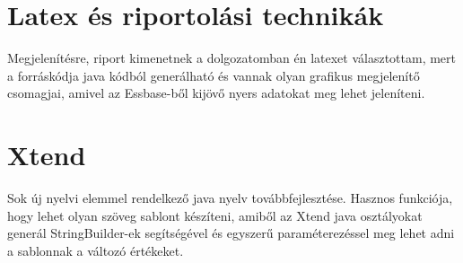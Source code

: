 \section{Latex és riportolási technikák}
Megjelenítésre, riport kimenetnek a dolgozatomban én latexet választottam, mert
a forráskódja java kódból generálható és vannak olyan grafikus megjelenítő
csomagjai, amivel az Essbase-ből kijövő nyers adatokat meg lehet jeleníteni.

\section{Xtend}
Sok új nyelvi elemmel rendelkező java nyelv továbbfejlesztése. Hasznos
funkciója, hogy lehet olyan szöveg sablont készíteni, amiből az Xtend java
osztályokat generál StringBuilder-ek segítségével és egyszerű paraméterezéssel meg lehet adni a
sablonnak a változó értékeket.

